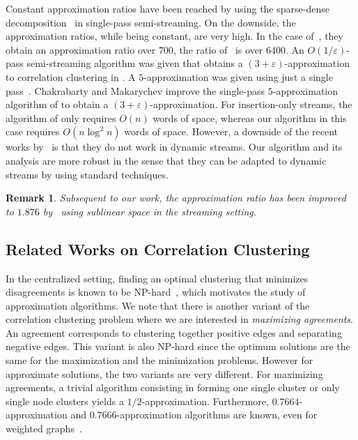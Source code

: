 \documentclass[10pt,a4paper]{article}
\newtheorem{remark}{Remark}[section]
\newcommand{\eps}{\ensuremath{\varepsilon}}
\begin{document}
Constant approximation ratios have been reached by using  the sparse-dense decomposition~\cite{cohen2021correlation, assadi2022} in single-pass semi-streaming.
On the downside, the approximation ratios, while being constant, are very high.
In the case of~\cite{cohen2021correlation}, they obtain an approximation ratio over $700$, the ratio of~\cite{assadi2022} is over $6400$. 
An $O(1/\eps)$-pass semi-streaming algorithm was given that obtains a $(3 + \eps)$-approximation to correlation clustering in \cite{Behnezhad2022}. A $5$-approximation was given using just a single pass~\cite{behnezhad2023single}.
Chakrabarty and Makarychev \cite{chakrabarty2023singlepass} improve the single-pass $5$-approximation algorithm of \cite{behnezhad2023single} to obtain a $(3 + \eps)$-approximation. For insertion-only streams, the algorithm of \cite{chakrabarty2023singlepass} only requires $O(n)$ words of space, whereas our algorithm in this case requires $O(n\log^2 n)$ words of space. However, a downside of the recent works by~\cite{Behnezhad2022, behnezhad2023single, chakrabarty2023singlepass} is that they do not work in dynamic streams.
Our algorithm and its analysis are more robust in the sense that they can be adapted to dynamic streams by using standard techniques.

\begin{remark}
    Subsequent to our work, the approximation ratio has been improved to $1.876$ by~\cite{DBLP:conf/stoc/Cohen-AddadLPTY24} using sublinear space in the streaming setting. 
\end{remark}


\subsection{Related Works on Correlation Clustering}
\label{sec:previouswork}

In the centralized setting, finding an optimal clustering that minimizes disagreements is known to be NP-hard~\cite{bansal2004correlation}, which motivates the study of approximation algorithms.
We note that there is another variant of the correlation clustering problem where we are interested in \emph{maximizing agreements}. An agreement corresponds to clustering together positive edges and separating negative edges. This variant is also NP-hard since the optimum solutions are the same for the maximization and the minimization problems.
However for approximate solutions, the two variants are very different.
For maximizing agreements, a trivial algorithm consisting in forming one single cluster or only single node clusters yields a $1/2$-approximation.
Furthermore, $0.7664$-approximation and $0.7666$-approximation algorithms are known, even for weighted graphs~\cite{swamy2004correlation, charikar2005clustering}.
\end{document}
